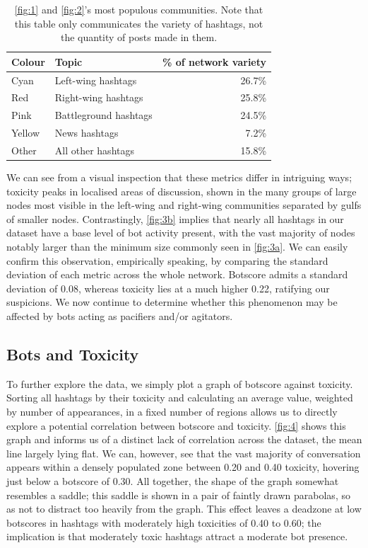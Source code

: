 \documentclass[a4paper,11pt]{article}  %
\begin{document}
	\begin{table}%
		\centering
		\begin{tabular}{||l l r||} 
			\hline
			Colour & Topic & \% of network variety \\ [0.5ex] 
			\hline\hline
			Cyan & Left-wing hashtags & 26.7\% \\ 
			\hline
			Red & Right-wing hashtags & 25.8\% \\
			\hline
			Pink & Battleground hashtags & 24.5\% \\
			\hline
			Yellow & News hashtags & 7.2\% \\
			\hline
			Other & All other hashtags & 15.8\% \\
			\hline
		\end{tabular}
		\caption{\autoref{fig:1} and \autoref{fig:2}'s most populous communities. Note that this table only communicates the variety of hashtags, not the quantity of posts made in them.}
		\label{tab:1}
	\end{table}
	
	We can see from a visual inspection that these metrics differ in intriguing ways; toxicity peaks in localised areas of discussion, shown in the many groups of large nodes most visible in the left-wing and right-wing communities separated by gulfs of smaller nodes. Contrastingly, \autoref{fig:3b} implies that nearly all hashtags in our dataset have a base level of bot activity present, with the vast majority of nodes notably larger than the minimum size commonly seen in \autoref{fig:3a}. We can easily confirm this observation, empirically speaking, by comparing the standard deviation of each metric across the whole network. Botscore admits a standard deviation of 0.08, whereas toxicity lies at a much higher 0.22, ratifying our suspicions. We now continue to determine whether this phenomenon may be affected by bots acting as pacifiers and/or agitators.
	
	\subsection{Bots and Toxicity}
	\label{subsec:bottox}
	
	To further explore the data, we simply plot a graph of botscore against toxicity. Sorting all hashtags by their toxicity and calculating an average value, weighted by number of appearances, in a fixed number of regions allows us to directly explore a potential correlation between botscore and toxicity. \autoref{fig:4} shows this graph and informs us of a distinct lack of correlation across the dataset, the mean line largely lying flat. We can, however, see that the vast majority of conversation appears within a densely populated zone between 0.20 and 0.40 toxicity, hovering just below a botscore of 0.30. All together, the shape of the graph somewhat resembles a saddle; this saddle is shown in a pair of faintly drawn parabolas, so as not to distract too heavily from the graph. This effect leaves a deadzone at low botscores in hashtags with moderately high toxicities of 0.40 to 0.60; the implication is that moderately toxic hashtags attract a moderate bot presence. 
\end{document}
